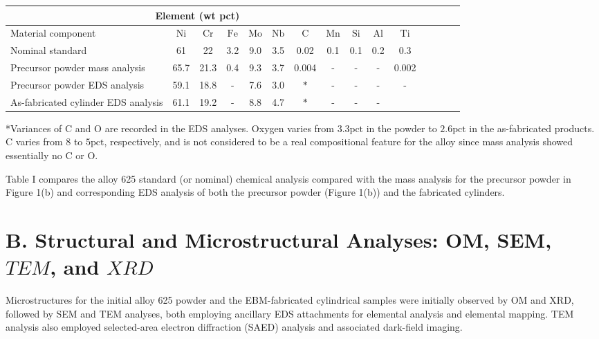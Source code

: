 \documentclass[10pt]{article}
\begin{document}
\begin{center}
\begin{tabular}{lcccccccccccccc}
\hline
\multicolumn{10}{c}{Element (wt pct)} &  \\
\hline
Material component & $\mathrm{Ni}$ & $\mathrm{Cr}$ & $\mathrm{Fe}$ & $\mathrm{Mo}$ & $\mathrm{Nb}$ & $\mathrm{C}$ & $\mathrm{Mn}$ & $\mathrm{Si}$ & $\mathrm{Al}$ & $\mathrm{Ti}$ \\
\hline
Nominal standard & 61 & 22 & 3.2 & 9.0 & 3.5 & 0.02 & 0.1 & 0.1 & 0.2 & 0.3 \\
Precursor powder mass analysis & 65.7 & 21.3 & 0.4 & 9.3 & 3.7 & 0.004 & - & - & - & 0.002 \\
Precursor powder EDS analysis & 59.1 & 18.8 & - & 7.6 & 3.0 & $*$ & - & - & - & - \\
As-fabricated cylinder EDS analysis & 61.1 & 19.2 & - & 8.8 & 4.7 & $*$ & - & - & - &  \\
\hline
\end{tabular}
\end{center}

*Variances of $\mathrm{C}$ and $\mathrm{O}$ are recorded in the EDS analyses. Oxygen varies from $3.3 \mathrm{pct}$ in the powder to $2.6 \mathrm{pct}$ in the as-fabricated products. $\mathrm{C}$ varies from 8 to $5 \mathrm{pct}$, respectively, and is not considered to be a real compositional feature for the alloy since mass analysis showed essentially no C or O.

Table I compares the alloy 625 standard (or nominal) chemical analysis compared with the mass analysis for the precursor powder in Figure 1(b) and corresponding EDS analysis of both the precursor powder (Figure 1(b)) and the fabricated cylinders.

\section*{B. Structural and Microstructural Analyses: OM, SEM, $T E M$, and $X R D$}
Microstructures for the initial alloy 625 powder and the EBM-fabricated cylindrical samples were initially observed by OM and XRD, followed by SEM and TEM analyses, both employing ancillary EDS attachments for elemental analysis and elemental mapping. TEM analysis also employed selected-area electron diffraction (SAED) analysis and associated dark-field imaging.
\end{document}
